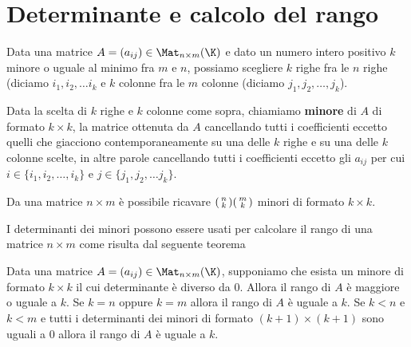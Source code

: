 \section{Determinante e calcolo del rango}
Data una matrice $A = (a_{ij}) \in \Mat_{n \times m}(\K)$ e dato un
numero intero positivo $k$ minore o uguale al minimo fra $m$ e $n$, possiamo
scegliere $k$ righe fra le $n$ righe (diciamo $i_1, i_2, \dots i_k$ e
$k$ colonne fra le $m$ colonne (diciamo $j_1, j_2, \dots, j_k$).

\begin{definition}
	Data la scelta di $k$ righe e $k$ colonne come sopra, chiamiamo
	\textbf{minore} di $A$ di formato $k \times k$, la matrice ottenuta da $A$
	cancellando tutti i coefficienti eccetto quelli che giacciono
	contemporaneamente su una delle $k$ righe e su una delle $k$ colonne scelte,
	in altre parole cancellando tutti i coefficienti eccetto gli $a_{ij}$ per
	cui $i \in \{i_1, i_2, \dots, i_k\}$ e $j \in \{j_1, j_2, \dots j_k\}$.
\end{definition}

\begin{observation}
	Da una matrice $n \times m$ è possibile ricavare $\begin{psmallmatrix}
			n \\ k \end{psmallmatrix} \begin{psmallmatrix}
			m \\ k \end{psmallmatrix}$ minori di formato $k \times k$.
\end{observation}

I determinanti dei minori possono essere usati per calcolare il rango di una
matrice $n \times m$ come risulta dal seguente teorema

\begin{theorem}
	Data una matrice $A = (a_{ij}) \in \Mat_{n \times m}(\K)$, supponiamo
	che esista un minore di formato $k \times k$ il cui determinante è diverso
	da 0. Allora il rango di $A$ è maggiore o uguale a $k$. Se $k = n$ oppure
	$k = m$ allora il rango di $A$ è uguale a $k$. Se $k < n$ e $k < m$ e tutti
	i determinanti dei minori di formato $(k + 1) \times (k + 1)$ sono uguali a 0
	allora il rango di $A$ è uguale a $k$.
\end{theorem}

